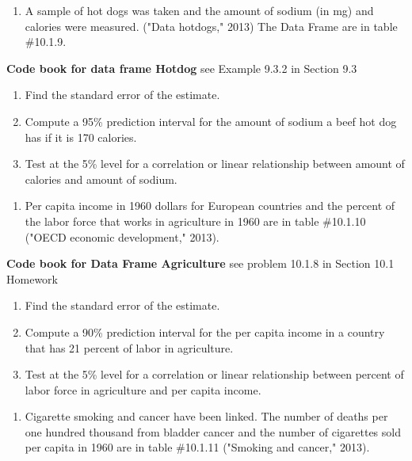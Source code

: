 \documentclass[
]{book}
\providecommand{\tightlist}{%
  \setlength{\itemsep}{0pt}\setlength{\parskip}{0pt}}
\begin{document}
\begin{enumerate}
\def\labelenumi{\arabic{enumi}.}
\setcounter{enumi}{6}
\tightlist
\item
  A sample of hot dogs was taken and the amount of sodium (in mg) and calories were measured. ("Data hotdogs," 2013) The Data Frame are in table \#10.1.9.
\end{enumerate}

\textbf{Code book for data frame Hotdog} see Example 9.3.2 in Section 9.3

\begin{enumerate}
\def\labelenumi{\alph{enumi}.}
\tightlist
\item
  Find the standard error of the estimate.
\item
  Compute a 95\% prediction interval for the amount of sodium a beef hot dog has if it is 170 calories.
\item
  Test at the 5\% level for a correlation or linear relationship between amount of calories and amount of sodium.
\end{enumerate}

\begin{enumerate}
\def\labelenumi{\arabic{enumi}.}
\setcounter{enumi}{7}
\tightlist
\item
  Per capita income in 1960 dollars for European countries and the percent of the labor force that works in agriculture in 1960 are in table \#10.1.10 ("OECD economic development," 2013).
\end{enumerate}

\textbf{Code book for Data Frame Agriculture} see problem 10.1.8 in Section 10.1 Homework

\begin{enumerate}
\def\labelenumi{\alph{enumi}.}
\tightlist
\item
  Find the standard error of the estimate.
\item
  Compute a 90\% prediction interval for the per capita income in a country that has 21 percent of labor in agriculture.
\item
  Test at the 5\% level for a correlation or linear relationship between percent of labor force in agriculture and per capita income.
\end{enumerate}

\begin{enumerate}
\def\labelenumi{\arabic{enumi}.}
\setcounter{enumi}{8}
\tightlist
\item
  Cigarette smoking and cancer have been linked. The number of deaths per one hundred thousand from bladder cancer and the number of cigarettes sold per capita in 1960 are in table \#10.1.11 ("Smoking and cancer," 2013).
\end{enumerate}
\end{document}

